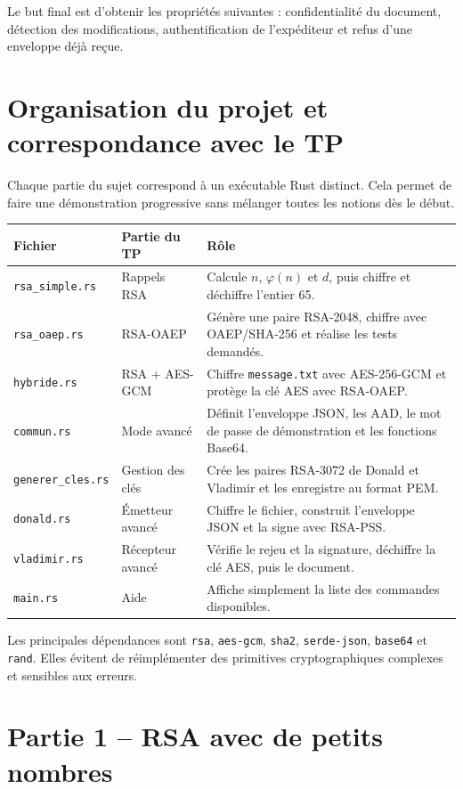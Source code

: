 \documentclass[11pt,a4paper]{article}
\newcommand{\fichier}[1]{\texttt{#1}}
\begin{document}
Le but final est d'obtenir les propriétés suivantes : confidentialité du document,
détection des modifications, authentification de l'expéditeur et refus d'une enveloppe
déjà reçue.

\section{Organisation du projet et correspondance avec le TP}

Chaque partie du sujet correspond à un exécutable Rust distinct. Cela permet de faire
une démonstration progressive sans mélanger toutes les notions dès le début.

\begin{longtable}{p{3.6cm}p{4.1cm}p{7.1cm}}
\toprule
\textbf{Fichier} & \textbf{Partie du TP} & \textbf{Rôle} \\
\midrule
\endhead
\fichier{rsa\_simple.rs} & Rappels RSA & Calcule $n$, $\varphi(n)$ et $d$, puis chiffre et déchiffre l'entier 65. \\
\fichier{rsa\_oaep.rs} & RSA-OAEP & Génère une paire RSA-2048, chiffre avec OAEP/SHA-256 et réalise les tests demandés. \\
\fichier{hybride.rs} & RSA + AES-GCM & Chiffre \fichier{message.txt} avec AES-256-GCM et protège la clé AES avec RSA-OAEP. \\
\fichier{commun.rs} & Mode avancé & Définit l'enveloppe JSON, les AAD, le mot de passe de démonstration et les fonctions Base64. \\
\fichier{generer\_cles.rs} & Gestion des clés & Crée les paires RSA-3072 de Donald et Vladimir et les enregistre au format PEM. \\
\fichier{donald.rs} & Émetteur avancé & Chiffre le fichier, construit l'enveloppe JSON et la signe avec RSA-PSS. \\
\fichier{vladimir.rs} & Récepteur avancé & Vérifie le rejeu et la signature, déchiffre la clé AES, puis le document. \\
\fichier{main.rs} & Aide & Affiche simplement la liste des commandes disponibles. \\
\bottomrule
\end{longtable}

Les principales dépendances sont \texttt{rsa}, \texttt{aes-gcm}, \texttt{sha2},
\texttt{serde-json}, \texttt{base64} et \texttt{rand}. Elles évitent de réimplémenter
des primitives cryptographiques complexes et sensibles aux erreurs.

\section{Partie 1 -- RSA avec de petits nombres}
\end{document}
